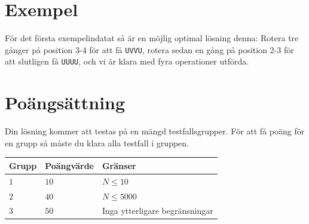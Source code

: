 \section*{Exempel}
För det första exempelindatat så är en möjlig optimal lösning denna: Rotera
tre gånger på position 3-4 för att få \texttt{UVVU}, rotera sedan en gång på
position 2-3 för att slutligen få \texttt{UUUU}, och vi är klara med fyra
operationer utförda.

\section*{Poängsättning}
Din lösning kommer att testas på en mängd testfallsgrupper.
För att få poäng för en grupp så måste du klara alla testfall i gruppen.

\noindent
\begin{tabular}{| l | l | l |}
  \hline
  Grupp & Poängvärde & Gränser \\ \hline
  $1$   & $10$       & $N \leq 10$ \\ \hline
  $2$   & $40$       & $N \leq 5000$ \\ \hline
  $3$   & $50$       & Inga ytterligare begränsningar \\ \hline
\end{tabular}